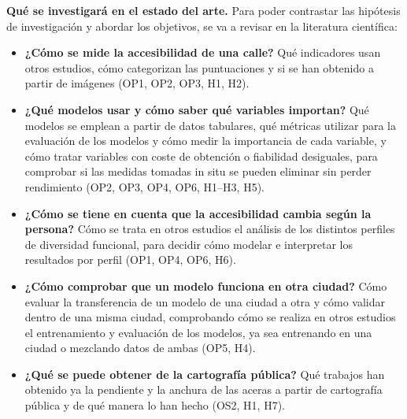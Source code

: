 \noindent\textbf{Qué se investigará en el estado del arte.} Para poder contrastar las hipótesis de investigación y abordar los objetivos, se va a revisar en la literatura científica:
\begin{itemize}
  \item \textbf{¿Cómo se mide la accesibilidad de una calle?} Qué indicadores usan otros estudios, cómo categorizan las puntuaciones y si se han obtenido a partir de imágenes (OP1, OP2, OP3, H1, H2).
  \item \textbf{¿Qué modelos usar y cómo saber qué variables importan?} Qué modelos se emplean a partir de datos tabulares, qué métricas utilizar para la evaluación de los modelos y cómo medir la importancia de cada variable, y cómo tratar variables con coste de obtención o fiabilidad desiguales, para comprobar si las medidas tomadas in situ se pueden eliminar sin perder rendimiento (OP2, OP3, OP4, OP6, H1--H3, H5).
  \item \textbf{¿Cómo se tiene en cuenta que la accesibilidad cambia según la persona?} Cómo se trata en otros estudios el análisis de los distintos perfiles de diversidad funcional, para decidir cómo modelar e interpretar los resultados por perfil (OP1, OP4, OP6, H6).
  \item \textbf{¿Cómo comprobar que un modelo funciona en otra ciudad?} Cómo evaluar la transferencia de un modelo de una ciudad a otra y cómo validar dentro de una misma ciudad, comprobando cómo se realiza en otros estudios el entrenamiento y evaluación de los modelos, ya sea entrenando en una ciudad o mezclando datos de ambas (OP5, H4).
  \item \textbf{¿Qué se puede obtener de la cartografía pública?} Qué trabajos han obtenido ya la pendiente y la anchura de las aceras a partir de cartografía pública y de qué manera lo han hecho (OS2, H1, H7).
\end{itemize}

